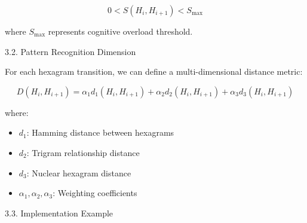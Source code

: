\documentclass{article}
\begin{document}
\begin{equation}
0 < S(H_i, H_{i+1}) < S_{\text{max}}
\end{equation}

where $S_{\text{max}}$ represents cognitive overload threshold.

3.2. Pattern Recognition Dimension 

For each hexagram transition, we can define a multi-dimensional distance metric:

\begin{equation}
D(H_i, H_{i+1}) = \alpha_1d_1(H_i, H_{i+1}) + \alpha_2d_2(H_i, H_{i+1}) + \alpha_3d_3(H_i, H_{i+1})
\end{equation}

where:
\begin{itemize}
\item $d_1$: Hamming distance between hexagrams
\item $d_2$: Trigram relationship distance
\item $d_3$: Nuclear hexagram distance
\item $\alpha_1, \alpha_2, \alpha_3$: Weighting coefficients
\end{itemize}

3.3. Implementation Example
\end{document}

